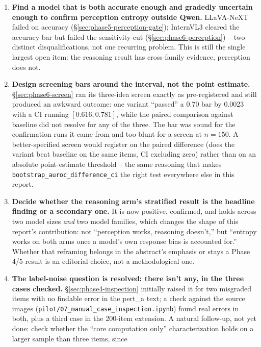 \documentclass[11pt]{article}
\begin{document}
\begin{enumerate}
  \item \textbf{Find a model that is both accurate enough and gradedly
    uncertain enough to confirm perception entropy outside Qwen.}
    LLaVA-NeXT failed on accuracy (\S\ref{sec:phase5-perception-gate});
    InternVL3 cleared the accuracy bar but failed the sensitivity cut
    (\S\ref{sec:phase6-perception}) -- two distinct disqualifications, not
    one recurring problem. This is still the single largest open item: the
    reasoning result has cross-family evidence, perception does not.
  \item \textbf{Design screening bars around the interval, not the point
    estimate.} \S\ref{sec:phase6-screen} ran its three-idea screen exactly
    as pre-registered and still produced an awkward outcome: one variant
    ``passed'' a 0.70 bar by 0.0023 with a CI running $[0.616, 0.781]$,
    while the paired comparison against baseline did not resolve for any
    of the three. The bar was sound for the confirmation runs it came
    from and too blunt for a screen at $n=150$. A better-specified screen
    would register on the paired difference (does the variant beat
    baseline on the same items, CI excluding zero) rather than on an
    absolute point-estimate threshold -- the same reasoning that makes
    \texttt{bootstrap\_auroc\_difference\_ci} the right test everywhere
    else in this report.
  \item \textbf{Decide whether the reasoning arm's stratified result is the
    headline finding or a secondary one.} It is now positive, confirmed,
    and holds across two model sizes \emph{and} two model families, which
    changes the shape of this report's contribution: not ``perception
    works, reasoning doesn't,'' but ``entropy works on both arms once a
    model's own response bias is accounted for.'' Whether that reframing
    belongs in the abstract's emphasis or stays a Phase 4/5 result is an
    editorial choice, not a methodological one.
  \item \textbf{The label-noise question is resolved: there isn't any, in the
    three cases checked.} \S\ref{sec:phase4-inspection} initially raised it
    for two misgraded items with no findable error in the pert\_a text; a
    check against the source images (\texttt{pilot/07\_manual\_case\_inspection.ipynb})
    found real errors in both, plus a third case in the 200-item extension.
    A natural follow-up, not yet done: check whether the ``core computation
    only'' characterization holds on a larger sample than three items, since

\end{enumerate}
\end{document}
